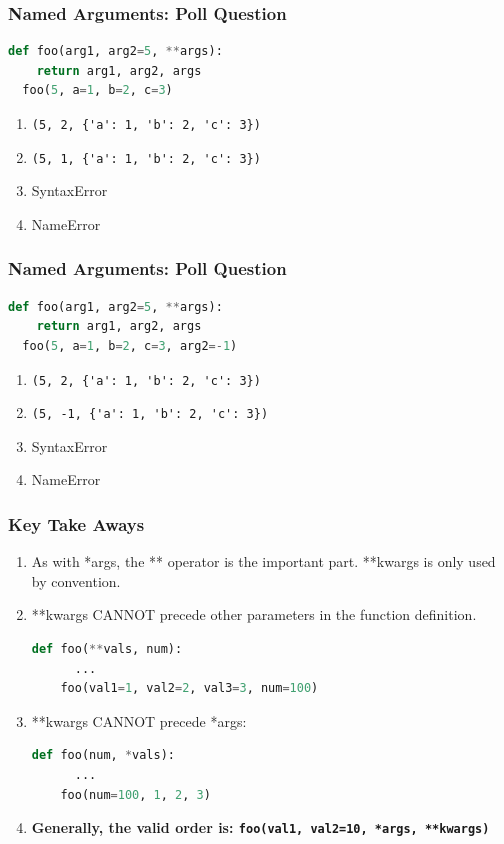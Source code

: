 \documentclass{beamer}
\begin{document}
%
%
\begin{frame}[fragile]
  \frametitle{Named Arguments: Poll Question}
  \begin{lstlisting}[language=Python, autogobble]
  def foo(arg1, arg2=5, **args):
    return arg1, arg2, args
  foo(5, a=1, b=2, c=3)
  \end{lstlisting}
  \vfill
  \begin{enumerate}[A]
    \item \lstinline|(5, 2, {'a': 1, 'b': 2, 'c': 3})|
    \item \lstinline|(5, 1, {'a': 1, 'b': 2, 'c': 3})|
    \item SyntaxError
    \item NameError
  \end{enumerate}
\end{frame}

%
%
\begin{frame}[fragile]
  \frametitle{Named Arguments: Poll Question}
  \begin{lstlisting}[language=Python, autogobble]
  def foo(arg1, arg2=5, **args):
    return arg1, arg2, args
  foo(5, a=1, b=2, c=3, arg2=-1)
  \end{lstlisting}
  \vfill
  \begin{enumerate}[A]
    \item \lstinline|(5, 2, {'a': 1, 'b': 2, 'c': 3})|
    \item \lstinline|(5, -1, {'a': 1, 'b': 2, 'c': 3})|
    \item SyntaxError
    \item NameError
  \end{enumerate}
\end{frame}


%
%
\begin{frame}[fragile]
  \frametitle{Key Take Aways}
  \begin{enumerate}[A]
    \item As with *args, the ** operator is the important part. **kwargs is only used by convention.
      \pause
    \item **kwargs CANNOT precede other parameters in the function definition.
      \pause
      \begin{lstlisting}[language=Python, autogobble]
    def foo(**vals, num):
      ...
    foo(val1=1, val2=2, val3=3, num=100)
      \end{lstlisting}
      \vfill
      \pause
    \item **kwargs CANNOT precede *args:
      \begin{lstlisting}[language=Python, autogobble]
    def foo(num, *vals):
      ...
    foo(num=100, 1, 2, 3)
      \end{lstlisting}
      \vfill
      \pause
    \item \textbf{Generally, the valid order is: \lstinline|foo(val1, val2=10, *args, **kwargs)|}
  \end{enumerate}
\end{frame}
\end{document}
